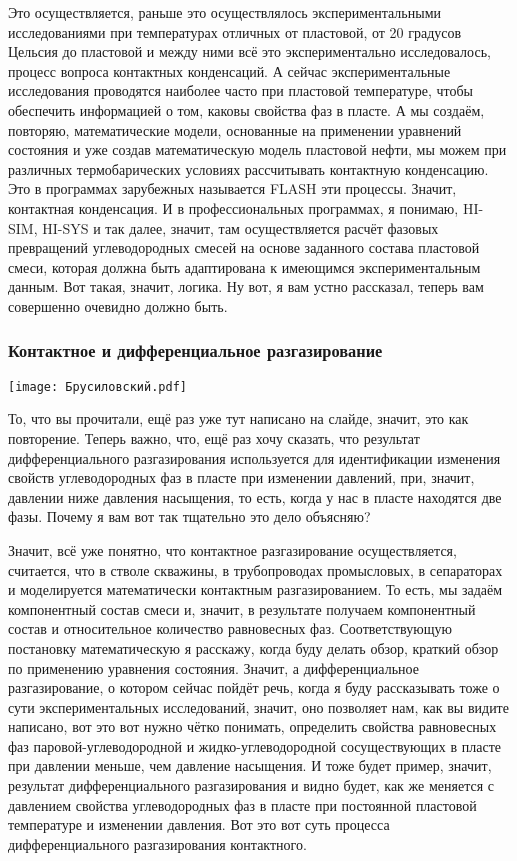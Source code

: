 \documentclass[main.tex]{subfiles}
\begin{document}
Это осуществляется, раньше это осуществлялось экспериментальными исследованиями при температурах отличных от пластовой, от 20 градусов Цельсия до пластовой и между ними всё это экспериментально исследовалось, процесс вопроса контактных конденсаций.
А сейчас экспериментальные исследования проводятся наиболее часто при пластовой температуре, чтобы обеспечить информацией о том, каковы свойства фаз в пласте.
А мы создаём, повторяю, математические модели, основанные на применении уравнений состояния и уже создав математическую модель пластовой нефти, мы можем при различных термобарических условиях рассчитывать контактную конденсацию.
Это в программах зарубежных называется FLASH эти процессы.
Значит, контактная конденсация.
И в профессиональных программах, я понимаю, HI-SIM, HI-SYS и так далее, значит, там осуществляется расчёт фазовых превращений углеводородных смесей на основе заданного состава пластовой смеси, которая должна быть адаптирована к имеющимся экспериментальным данным.
Вот такая, значит, логика.
Ну вот, я вам устно рассказал, теперь вам совершенно очевидно должно быть.

\subsubsection{Контактное и дифференциальное разгазирование}

\begin{center}
\texttt{[image: Брусиловский.pdf]}
\end{center}

То, что вы прочитали, ещё раз уже тут написано на слайде, значит, это как повторение.
Теперь важно, что, ещё раз хочу сказать, что результат дифференциального разгазирования используется для идентификации изменения свойств углеводородных фаз в пласте при изменении давлений, при, значит, давлении ниже давления насыщения, то есть, когда у нас в пласте находятся две фазы.
Почему я вам вот так тщательно это дело объясняю?

Значит, всё уже понятно, что контактное разгазирование осуществляется, считается, что в стволе скважины, в трубопроводах промысловых, в сепараторах и моделируется математически контактным разгазированием.
То есть, мы задаём компонентный состав смеси и, значит, в результате получаем компонентный состав и относительное количество равновесных фаз.
Соответствующую постановку математическую я расскажу, когда буду делать обзор, краткий обзор по применению уравнения состояния.
Значит, а дифференциальное разгазирование, о котором сейчас пойдёт речь, когда я буду рассказывать тоже о сути экспериментальных исследований, значит, оно позволяет нам, как вы видите написано, вот это вот нужно чётко понимать, определить свойства равновесных фаз паровой-углеводородной и жидко-углеводородной сосуществующих в пласте при давлении меньше, чем давление насыщения.
И тоже будет пример, значит, результат дифференциального разгазирования и видно будет, как же меняется с давлением свойства углеводородных фаз в пласте при постоянной пластовой температуре и изменении давления.
Вот это вот суть процесса дифференциального разгазирования контактного.
\end{document}
